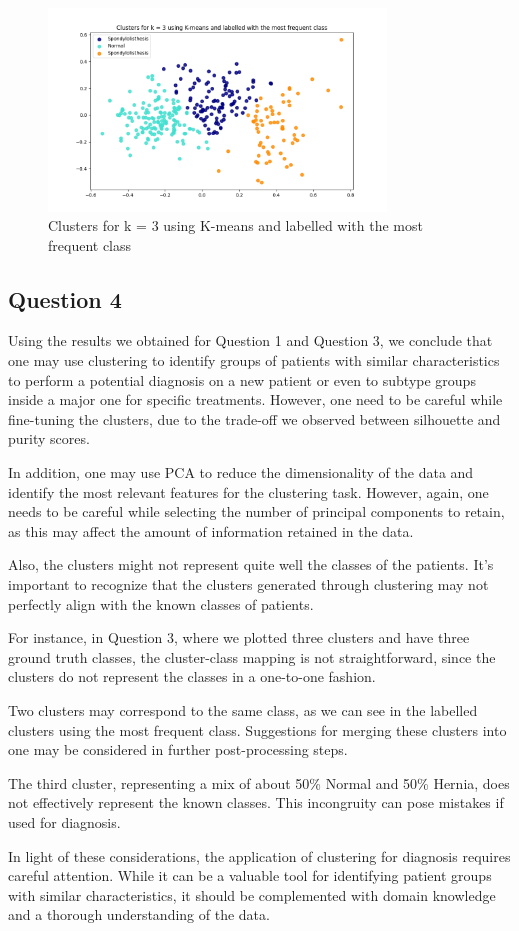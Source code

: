 \documentclass{article}
\begin{document}
\begin{figure}[H]
  \centering
  \includegraphics[width=0.8\textwidth]{images/clusters_frequency.png}
  \caption{Clusters for k = 3 using K-means and labelled with the most frequent class}
  \label{fig:clusters_frequency}
\end{figure}

\subsection*{Question 4}


  Using the results we obtained for Question 1 and Question 3, we conclude that one may use clustering to identify groups of patients with similar characteristics to perform a potential diagnosis on a new patient or even to subtype groups inside a major one for specific treatments. However, one need to be careful while fine-tuning the clusters, due to the trade-off we observed between silhouette and purity scores.

In addition, one may use PCA to reduce the dimensionality of the data and identify the most relevant features for the clustering task.
However, again, one needs to be careful while selecting the number of principal components to retain, as this may affect the amount of information retained in the data.

Also, the clusters might not represent quite well the classes of the patients. It's important to recognize that the clusters generated through clustering may not perfectly align with the known classes of patients.

For instance, in Question 3, where we plotted three clusters and have three ground truth classes, the cluster-class mapping is not straightforward, since the clusters do not represent the classes in a one-to-one fashion.

Two clusters may correspond to the same class, as we can see in the labelled clusters using the most frequent class. Suggestions for merging these clusters into one may be considered in further post-processing steps.

The third cluster, representing a mix of about 50\% Normal and 50\% Hernia, does not effectively represent the known classes. This incongruity can pose mistakes if used for diagnosis.

In light of these considerations, the application of clustering for diagnosis requires careful attention. While it can be a valuable tool for identifying patient groups with similar characteristics, it should be complemented with domain knowledge and a thorough understanding of the data.
\end{document}
